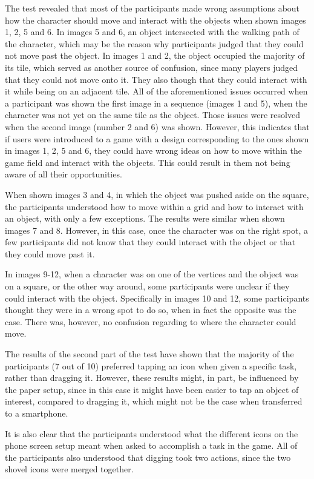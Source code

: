 The test revealed that most of the participants made wrong assumptions about how the character should move and interact with the objects when shown images 1, 2, 5 and 6. In images 5 and 6, an object intersected with the walking path of the character, which may be the reason why participants judged that they could not move past the object. In images 1 and 2, the object occupied the majority of its tile, which served as another source of confusion, since many players judged that they could not move onto it. They also though that they could interact with it while being on an adjacent tile. All of the aforementioned issues occurred when a participant was shown the first image in a sequence (images 1 and 5), when the character was not yet on the same tile as the object. Those issues were resolved when the second image (number 2 and 6) was shown. However, this indicates that if users were introduced to a game with a design corresponding to the ones shown in images 1, 2, 5 and 6, they could have wrong ideas on how to move within the game field and interact with the objects. This could result in them not being aware of all their opportunities.

When shown images 3 and 4, in which the object was pushed aside on the square, the participants understood how to move within a grid and how to interact with an object, with only a few exceptions. The results were similar when shown images 7 and 8. However, in this case, once the character was on the right spot, a few participants did not know that they could interact with the object or that they could move past it. 

In images 9-12, when a character was on one of the vertices and the object was on a square, or the other way around, some participants were unclear if they could interact with the object. Specifically in images 10 and 12, some participants thought they were in a wrong spot to do so, when in fact the opposite was the case. There was, however, no confusion regarding to where the character could move.

The results of the second part of the test have shown that the majority of the participants (7 out of 10) preferred tapping an icon when given a specific task, rather than dragging it. However, these results might, in part, be influenced by the paper setup, since in this case it might have been easier to tap an object of interest, compared to dragging it, which might not be the case when transferred to a smartphone. 

It is also clear that the participants understood what the different icons on the phone screen setup meant when asked to accomplish a task in the game. All of the participants also understood that digging took two actions, since the two shovel icons were merged together. 

